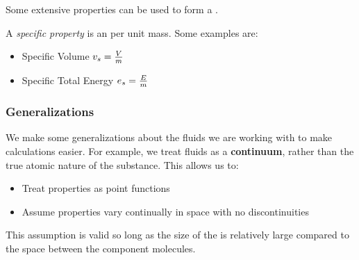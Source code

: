 Some extensive properties can be used to form a .
\begin{definition}\label{def:Specific_Property}
  A \emph{specific property} is an  per unit mass.
  Some examples are:
  \begin{itemize}[noitemsep]
  \item Specific Volume $v_{s} = \frac{V}{m}$
  \item Specific Total Energy $e_{s} = \frac{E}{m}$
  \end{itemize}
\end{definition}

\subsubsection{Generalizations}\label{subsubsec:Generalizations}
We make some generalizations about the fluids we are working with to make calculations easier.
For example, we treat fluids as a \textbf{continuum}, rather than the true atomic nature of the substance.
This allows us to:
\begin{itemize}[noitemsep]
\item Treat properties as point functions
\item Assume properties vary continually in space with no discontinuities
\end{itemize}

This assumption is valid so long as the size of the  is relatively large compared to the space between the component molecules.

